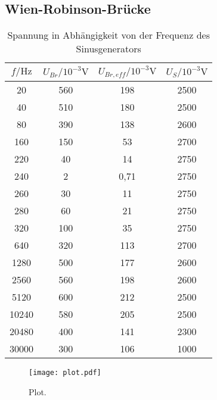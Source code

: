 \subsection{Wien-Robinson-Brücke}

\begin{table}
  \centering
  \caption{Spannung in Abhängigkeit von der Frequenz des Sinusgenerators}
  \label{tab:Wien-Robinson}
  \begin{tabular}{c c c c}
    \toprule
    $f/\unit{\hertz}$ & $ U_{Br}/10^{-3}\unit{\volt}$ & $U_{Br,eff}/10^{-3}\unit{\volt}$ & $U_{S}/10^{-3}\unit{\volt}$ \\
    \midrule
       20 & 560 & 198   & 2500 \\
       40 & 510 & 180   & 2500 \\
       80 & 390 & 138   & 2600 \\
      160 & 150 &  53   & 2700 \\
      220 &  40 &  14   & 2750 \\
      240 &   2 &  0,71 & 2750 \\
      260 &  30 &  11   & 2750 \\
      280 &  60 &  21   & 2750 \\
      320 & 100 &  35   & 2750 \\
      640 & 320 & 113   & 2700 \\
     1280 & 500 & 177   & 2600 \\
     2560 & 560 & 198   & 2600 \\
     5120 & 600 & 212   & 2500 \\
    10240 & 580 & 205   & 2500 \\
    20480 & 400 & 141   & 2300 \\
    30000 & 300 & 106   & 1000 \\
    \bottomrule
  \end{tabular}
\end{table}

\begin{figure}
  \centering
  \texttt{[image: plot.pdf]}
  \caption{Plot.}
  \label{fig:plot}
\end{figure}